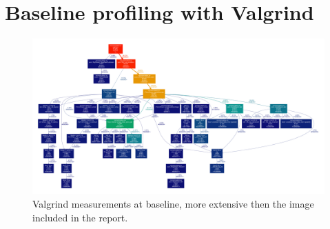 \section{Baseline profiling with Valgrind}
\label{sec:valgrind}
\begin{figure}[!htbp]
  \centering
  \includegraphics[height=0.45\textheight, angle=90]{images/mediumMotivationalValgrind.pdf}
  \caption{Valgrind measurements at baseline, more extensive then the
    image included in the report.}
  \label{fig:mediumValgrind}
\end{figure}






